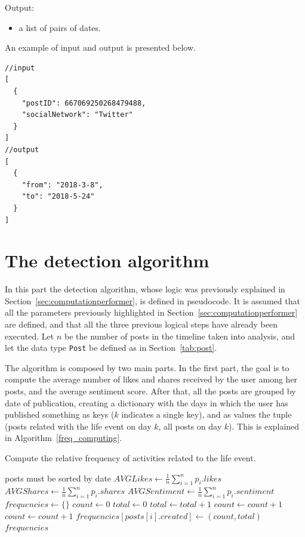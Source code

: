 Output:
\begin{itemize}
\item a list of pairs of dates.
\end{itemize}

An example of input and output is presented below.
\begin{multicols}{2}
\begin{Verbatim}
//input
[
  {
    "postID": 667069250268479488,
    "socialNetwork": "Twitter"
  }
]
//output
[
  {
    "from": "2018-3-8",
    "to": "2018-5-24"
  }
]
\end{Verbatim}
\end{multicols}

\section{The detection algorithm}
\label{sec:alg}

In this part the detection algorithm, whose logic was previously explained in Section~\ref{sec:computationperformer}, is defined in pseudocode. It is assumed that all the parameters previously highlighted in Section~\ref{sec:computationperformer} are defined, and that all the three previous logical steps have already been executed. Let $n$ be the number of posts in the timeline taken into analysis, and let the data type \texttt{Post} be defined as in Section~\ref{tab:post}.

The algorithm is composed by two main parts. In the first part, the goal is to compute the average number of likes and shares received by the user among her posts, and the average sentiment score. After that, all the posts are grouped by date of publication, creating a dictionary with the days in which the user has published something as keys ($k$ indicates a single key), and as values the tuple (posts related with the life event on day $k$, all posts on day $k$). This is explained in Algorithm~\ref{freq_computing}.

\begin{algorithm}
\caption{Compute the relative frequency of activities related to the life event.}
\label{freq_computing}
\begin{algorithmic}[1]
\Require posts must be sorted by date
\State $AVGLikes \gets \frac{1}{n} \sum_{i=1}^n p_i.likes $
\State $AVGShares \gets \frac{1}{n} \sum_{i=1}^n p_i.shares $
\State $AVGSentiment \gets \frac{1}{n} \sum_{i=1}^n p_i.sentiment$
\State $frequencies \gets \{\}$
\State $count \gets 0$
\State $total \gets 0$
	\State $total \gets total + 1$
		\State $count \gets count + 1$
		\State $count \gets count + 1$
	\EndIf
		\State $frequencies[posts[i].created] \gets (count, total)$
	\EndIf
\EndFor
\Return $frequencies$
\EndFunction 
\end{algorithmic}
\end{algorithm}

